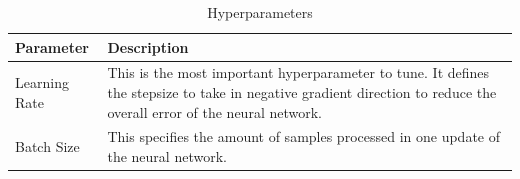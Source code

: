 \begingroup
\renewcommand\arraystretch{1.3}  %
\begin{table}[b!]  %
\centering
\caption{Hyperparameters}  %
\label{tab:hyperparameters}
\begin{tabularx}{\linewidth}{lX}
	\toprule
	\textbf{Parameter} & \textbf{Description}\\
	\midrule
Learning Rate & This is the most important hyperparameter to tune. It defines the stepsize to take in negative gradient direction to reduce the overall error of the neural network.\\
Batch Size & This specifies the amount of samples processed in one update of the neural network.\\
	\bottomrule
\end{tabularx}
\end{table}
\endgroup

